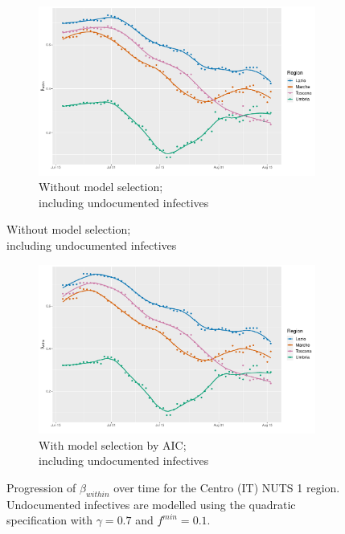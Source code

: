 \documentclass[12pt]{article}
\begin{document}
\begin{appendices}
\begin{figure}[H]
    	\end{figure}
        \begin{figure}[H]\ContinuedFloat
    	    \begin{subfigure}{\textwidth}
    	      \centering
    	      \includegraphics[width=0.94\linewidth]{output/model_within_lag14_betawithin_Centro (IT)_UndocQuadratic_rolling.pdf}
    	      \caption{Without model selection; \\ including undocumented infectives}
    	      \label{fig:beta_within_over_time_centro_regular_undoc}
    	    \end{subfigure}\newline
        \end{figure}
        \begin{figure}[H]\ContinuedFloat
    	    \begin{subfigure}{\textwidth}
    	      \centering
    	      \includegraphics[width=0.94\linewidth]{output/model_within_lag14_betawithin_Centro (IT)_aic_UndocQuadratic_rolling.pdf}
    	      \caption{With model selection by AIC; \\ including undocumented infectives}
    	      \label{fig:beta_within_over_time_centro_aic_undoc}
    	    \end{subfigure}
    	    \caption{Progression of $\beta_{within}$ over time for the Centro (IT) NUTS 1 region. Undocumented infectives are modelled using the quadratic specification with $\gamma = 0.7$ and $f^{min}=0.1$.}
    	    \label{fig:beta_within_over_time_centro}
	    \end{figure}
		

\end{appendices}
\end{document}
